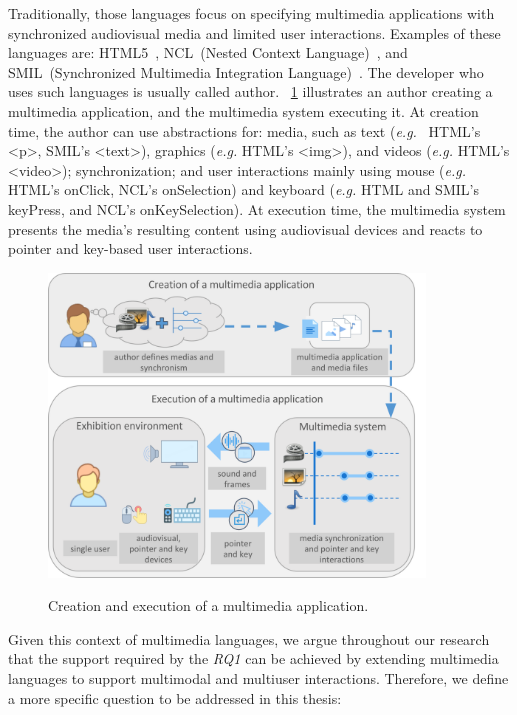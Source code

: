 \documentclass[
  doutorado,
  american
]{ThesisPUC}
\newcommand{\fig}[1]{\figurename~\ref{#1}}
\newcommand{\captionvspace}{\vspace{-1.3em}}
\begin{document}
Traditionally, those languages focus on specifying multimedia applications with
synchronized audiovisual media and limited user interactions. Examples of these
languages are: HTML5~\cite{w3c_html_2014}, NCL~(Nested Context Language)~\cite{abnt_abnt_2016}, and SMIL~(Synchronized
Multimedia Integration Language)~\cite{bulterman_smil_2008}. The developer who uses such languages is
usually called author. \fig{fig:overview-multimedia} illustrates an author
creating a multimedia application, and the multimedia system executing it. At
creation time, the author can use abstractions for: media, such as text (\textit{e.g.}~
HTML’s <p>, SMIL’s <text>), graphics (\textit{e.g.} HTML’s <img>), and videos 
(\textit{e.g.} HTML’s
<video>); synchronization; and user interactions mainly using mouse 
(\textit{e.g.} HTML’s
onClick, NCL’s onSelection) and keyboard (\textit{e.g.} HTML and SMIL’s 
keyPress, and
NCL’s onKeySelection). At execution time, the multimedia system presents the
media’s resulting content using audiovisual devices and reacts to pointer and
key-based user interactions.

\begin{figure}[!ht]
\begin{center}
	\includegraphics[width=10cm, keepaspectratio]{img/img4.png}
	\caption{Creation and execution of a multimedia application.}
    \captionvspace
	\label{fig:overview-multimedia}
\end{center}
\end{figure}

Given this context of multimedia languages, we argue throughout our research
that the support required by the \textit{RQ1} can be achieved by extending
multimedia languages to support multimodal and multiuser interactions.
Therefore, we define a more specific question to be addressed in this thesis:
\end{document}
